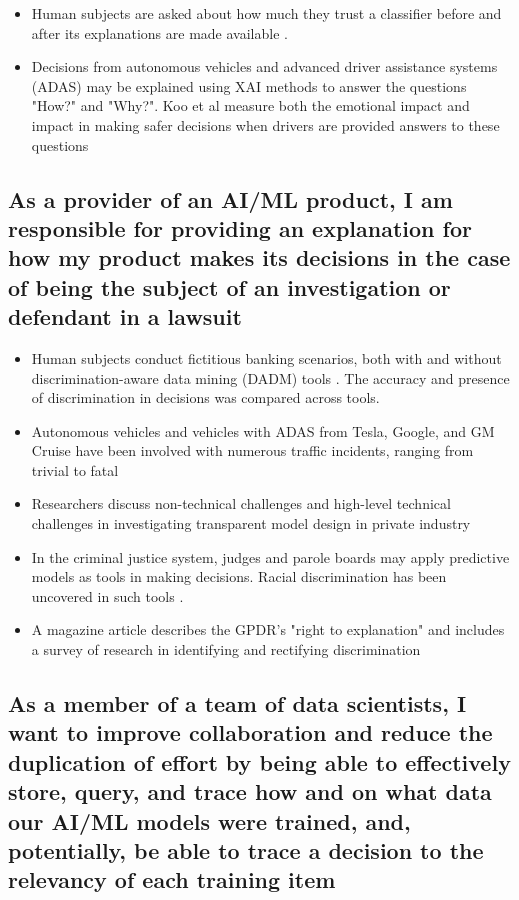 \documentclass{IEEEtran}
\begin{document}
\begin{itemize}
    \item Human subjects are asked about how much they trust a classifier before and after its explanations are made available \cite{Ribeiro:2016:WIT:2939672.2939778}.  
    \item Decisions from autonomous vehicles and advanced driver assistance systems (ADAS) may be explained using XAI methods to answer the questions "How?" and "Why?".  Koo et al measure both the emotional impact and impact in making safer decisions when drivers are provided answers to these questions \cite{Koo2015}
\end{itemize}

\subsection{As a provider of an AI/ML product, I am responsible for providing an explanation for how my product makes its decisions in the case of being the subject of an investigation or defendant in a lawsuit}

\begin{itemize}
    \item Human subjects conduct fictitious banking scenarios, both with and without discrimination-aware data mining (DADM) tools \cite{Berendt2014}.  The accuracy and presence of discrimination in decisions was compared across tools.
    \item Autonomous vehicles and vehicles with ADAS from Tesla, Google, and GM Cruise have been involved with numerous traffic incidents, ranging from trivial to fatal \cite{Read2016} \cite{Tesla2018} \cite{Ackerman2016} \cite{Bhavsar2017} 
    \item Researchers discuss non-technical challenges and high-level technical challenges in investigating transparent model design in private industry \cite{Veale:2018:FAD:3173574.3174014}
    \item In the criminal justice system, judges and parole boards may apply predictive models as tools in making decisions.  Racial discrimination has been uncovered in such tools \cite{Wexler.2017} \cite{Angwin2016}.
    \item A magazine article describes the GPDR's "right to explanation" and includes a survey of research in identifying and rectifying discrimination \cite{Goodman2017EuropeanUR}
\end{itemize}

\subsection{As a member of a team of data scientists, I want to improve collaboration and reduce the duplication of effort by being able to effectively store, query, and trace how and on what data our  AI/ML models were trained, and, potentially, be able to trace a decision to the relevancy of each training item}
\end{document}
